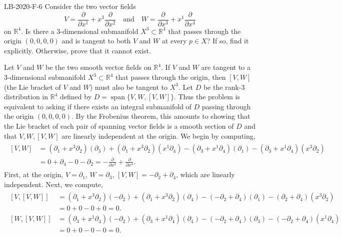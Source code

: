 \documentclass{article}
\begin{document}
	\begin{prb}{LB-2020-F-6}
		Consider the two vector fields 
		\begin{equation*}
			V = \frac{\partial}{\partial x^{1}} + x^{3}\frac{\partial}{\partial x^{2}} \quad \text{and} \quad W = \frac{\partial}{\partial x^{3}} + x^{1}\frac{\partial}{\partial x^{4}}
		\end{equation*}
		on $\mathbb{R}^{4}$. Is there a 3-dimensional submanifold $X^{3} \subset \mathbb{R}^{4}$ that passes through the origin $(0,0,0,0)$ and is tangent to both $V$ and $W$ at every $p \in X$? If so, find it explicitly. Otherwise, prove that it cannot exist. 
	\end{prb}
	Let $V$ and $W$ be the two smooth vector fields on $\mathbb{R}^{4}$. If $V$ and $W$ are tangent to a 3-dimensional submanifold $X^{3} \subset \mathbb{R}^{4}$ that passes through the origin, then $[V, W]$ (the Lie bracket of $V$ and $W$) must also be tangent to $X^{3}$. Let $D$ be the rank-3 distribution in $\mathbb{R}^{4}$ defined by $D = \operatorname{span}\{V, W, [V, W]\}$. Thus the problem is equivalent to asking if there exists an integral submanifold of $D$ passing through the origin $(0,0,0,0)$. By the Frobenius theorem, this amounts to showing that the Lie bracket of each pair of spanning vector fields is a smooth section of $D$ and that $V, W, [V, W]$ are linearly independent at the origin. We begin by computing, 
	\begin{align*}
		\begin{split}
			[V, W] &= \left(\partial_{1} + x^{3}\partial_{2}\right)(\partial_{3}) + (\partial_{1} + x^{3}\partial_{2})(x^{1}\partial_{4}) - (\partial_{3} + x^{1}\partial_{4})(\partial_{1})- (\partial_{3} + x^{1}\partial_{4})(x^{3}\partial_{2}) \\
			&= 0 + \partial_{4} - 0 - \partial_{2} = -\frac{\partial}{\partial x^{2}} + \frac{\partial}{\partial x^{4}}. 
		\end{split}
	\end{align*}
	First, at the origin, $V = \partial_{1}$, $W = \partial_{3}$, $[V, W] = -\partial_{2} + \partial_{4}$, which are linearly independent. Next, we compute, 
	\begin{align*}
		\begin{split}
			[V, [V, W]] &= (\partial_{1}+ x^{3}\partial_{2})(-\partial_{2}) + (\partial_{1} + x^{3}\partial_{2})(\partial_{4}) - (-\partial_{2} + \partial_{4})(\partial_{1}) - (\partial_{2} + \partial_{4})(x^{3}\partial_{2}) \\
			&= 0 + 0 - 0 + 0 =0.  \\
			[W, [V, W]] &= (\partial_{3} + x^{1}\partial_{4})(-\partial_{2}) + (\partial_{3} + x^{1}\partial_{4})(\partial_{4}) -(-\partial_{2} + \partial_{4})(\partial_{3}) - (-\partial_{2} + \partial_{4})(x^{1}\partial_{4}) \\
			&= 0 + 0 - 0 - 0 = 0. 
		\end{split}
	\end{align*}
\end{document}
